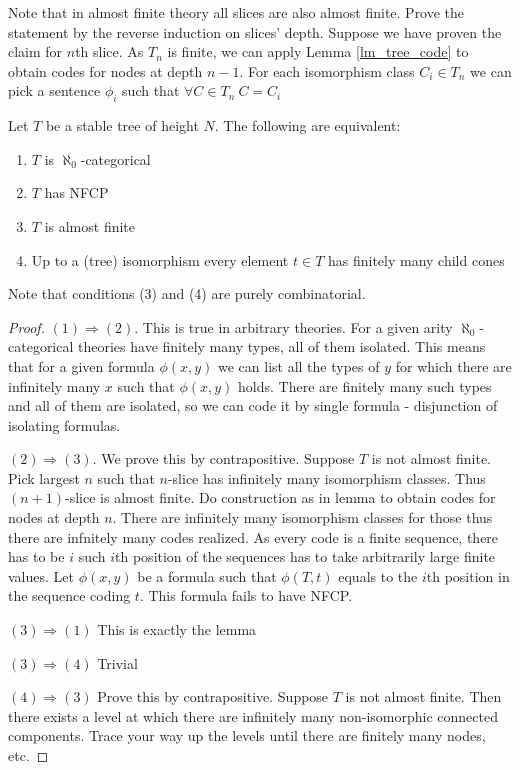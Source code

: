 \documentclass{amsart}
\begin{document}
\begin{Proof}
	Note that in almost finite theory all slices are also almost finite. Prove the statement by the reverse induction on slices' depth. Suppose we have proven the claim for $n$th slice. As $T_n$ is finite, we can apply Lemma \ref{lm_tree_code} to obtain codes for nodes at depth $n-1$. For each isomorphism class $C_i \in T_n$ we can pick a sentence $\phi_i$ such that $\forall C \in T_n \  C = C_i$
\end{Proof}



\begin{Theorem}
	Let $T$ be a stable tree of height $N$. The following are equivalent:
	\begin{enumerate}
		\item $T$ is $\aleph_0$-categorical
		\item $T$ has NFCP
		\item $T$ is almost finite
		\item Up to a (tree) isomorphism every element $t \in T$ has finitely many child cones
	\end{enumerate}
\end{Theorem}

Note that conditions (3) and (4) are purely combinatorial.

\begin{proof}
	$(1) \Rightarrow (2)$. This is true in arbitrary theories. For a given arity $\aleph_0$-categorical theories have finitely many types, all of them isolated. This means that for a given formula $\phi(x, y)$ we can list all the types of $y$ for which there are infinitely many $x$ such that $\phi(x, y)$ holds. There are finitely many such types and all of them are isolated, so we can code it by single formula - disjunction of isolating formulas.
	
	$(2) \Rightarrow (3)$. We prove this by contrapositive. Suppose $T$ is not almost finite. Pick largest $n$ such that $n$-slice has infinitely many isomorphism classes. Thus $(n+1)$-slice is almost finite. Do construction as in lemma to obtain codes for nodes at depth $n$. There are infinitely many isomorphism classes for those thus there are infnitely many codes realized. As every code is a finite sequence, there has to be $i$ such $i$th position of the sequences has to take arbitrarily large finite values. Let $\phi(x,y)$ be a formula such that $\phi(T, t)$ equals to the $i$th position in the sequence coding $t$. This formula fails to have NFCP.
	
	$(3) \Rightarrow (1)$ This is exactly the lemma
	
	$(3) \Rightarrow (4)$ Trivial
	
	$(4) \Rightarrow (3)$ Prove this by contrapositive. Suppose $T$ is not almost finite. Then there exists a level at which there are infinitely many non-isomorphic connected components. Trace your way up the levels until there are finitely many nodes, etc.
\end{proof}
\end{document}
